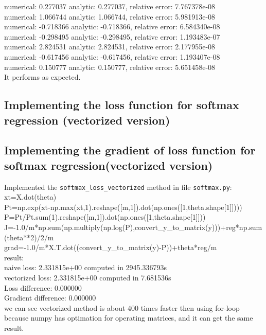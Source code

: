 \documentclass{article}
\begin{document}
numerical: 0.277037 analytic: 0.277037, relative error: 7.767378e-08\\
numerical: 1.066744 analytic: 1.066744, relative error: 5.981913e-08\\
numerical: -0.718366 analytic: -0.718366, relative error: 6.584340e-08\\
numerical: -0.298495 analytic: -0.298495, relative error: 1.193483e-07\\
numerical: 2.824531 analytic: 2.824531, relative error: 2.177955e-08\\
numerical: -0.617456 analytic: -0.617456, relative error: 1.193407e-08\\
numerical: 0.150777 analytic: 0.150777, relative error: 5.651458e-08\\[10pt]
It performs as expected.\\
\subsection{Implementing the loss function for softmax regression (vectorized version)}
\subsection{Implementing the gradient of loss function for softmax regression(vectorized version)}
Implemented the \verb|softmax_loss_vectorized| method in file \verb|softmax.py|:\\[10pt]
xt=X.dot(theta)\\
Pt=np.exp(xt-np.max(xt,1).reshape([m,1]).dot(np.ones([1,theta.shape[1]])))\\
P=Pt/Pt.sum(1).reshape([m,1]).dot(np.ones([1,theta.shape[1]]))\\
J=-1.0/m*np.sum(np.multiply(np.log(P),convert\_y\_to\_matrix(y)))+reg*np.sum(theta**2)/2/m\\ grad=-1.0/m*X.T.dot((convert\_y\_to\_matrix(y)-P))+theta*reg/m\\[10pt]
result:\\[10pt]
naive loss: 2.331815e+00 computed in 2945.336793s\\
vectorized loss: 2.331815e+00 computed in 7.681536s\\
Loss difference: 0.000000\\
Gradient difference: 0.000000\\[10pt]
we can see vectorized method is about 400 times faster then using for-loop because numpy has optimation for operating matrices, and it can get the same result.\\
\end{document}
